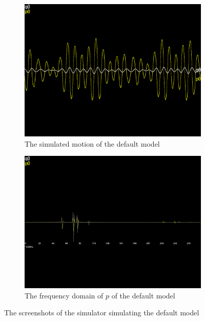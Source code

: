 \documentclass[12pt]{article}
\begin{document}
\begin{figure}[h]
  \centering
  \begin{subfigure}[b]{0.45\linewidth}
    \includegraphics[width=\linewidth]{default_motion.png}
    \caption{The simulated motion of the default model}
  \end{subfigure}
  \begin{subfigure}[b]{0.45\linewidth}
    \includegraphics[width=\linewidth]{default_p0_frequencies.png}
    \caption{The frequency domain of $p$ of the default model}
  \end{subfigure}
  \caption{The screenshots of the simulator simulating the default model}
  \label{fig:default}
\end{figure}
\end{document}
